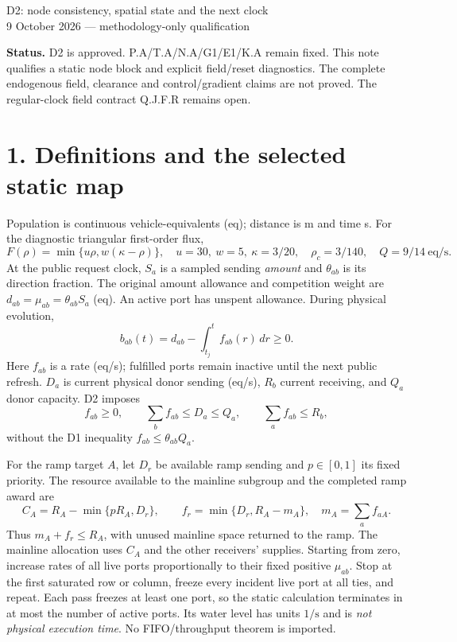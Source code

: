 \documentclass[11pt,a4paper]{article}
\begin{document}
\begin{center}{\Large D2: node consistency, spatial state and the next clock}\\[4pt]
9 October 2026 --- methodology-only qualification\end{center}
\textbf{Status.} D2 is approved. P.A/T.A/N.A/G1/E1/K.A remain fixed.
This note qualifies a static node block and explicit field/reset diagnostics.
The complete endogenous field, clearance and control/gradient claims are not
proved. The regular-clock field contract Q.J.F.R remains open.

\section*{1. Definitions and the selected static map}
Population is continuous vehicle-equivalents (eq); distance is m and time s.
For the diagnostic triangular first-order flux,
\[
 F(\rho)=\min\{u\rho,w(\kappa-\rho)\},\quad
 u=30,\ w=5,\ \kappa=3/20,\quad
 \rho_c=3/140,\quad Q=9/14\ \mathrm{eq/s}.
\]
At the public request clock, $S_a$ is a sampled sending \emph{amount} and
$\theta_{ab}$ is its direction fraction. The original amount allowance and
competition weight are $d_{ab}=\mu_{ab}=\theta_{ab}S_a$ (eq).
An active port has unspent allowance. During physical evolution,
\[
 b_{ab}(t)=d_{ab}-\int_{t_j}^{t}f_{ab}(r)\,dr\ge0.
\]
Here $f_{ab}$ is a rate (eq/s); fulfilled ports remain inactive until the
next public refresh. $D_a$ is current physical donor sending (eq/s),
$R_b$ current receiving, and $Q_a$ donor capacity. D2 imposes
\[
 f_{ab}\ge0,\qquad \sum_b f_{ab}\le D_a\le Q_a,\qquad
 \sum_a f_{ab}\le R_b,
\]
without the D1 inequality $f_{ab}\le\theta_{ab}Q_a$.

For the ramp target $A$, let $D_r$ be available ramp sending and
$p\in[0,1]$ its fixed priority. The resource available to the mainline
subgroup and the completed ramp award are
\[
 C_A=R_A-\min\{pR_A,D_r\},\qquad
 f_r=\min\{D_r,R_A-m_A\},\quad m_A=\sum_a f_{aA}.
\]
Thus $m_A+f_r\le R_A$, with unused mainline space returned to the ramp.
The mainline allocation uses $C_A$ and the other receivers' supplies.
Starting from zero, increase rates of all live ports proportionally to their
fixed positive $\mu_{ab}$. Stop at the first saturated row or column,
freeze every incident live port at all ties, and repeat. Each pass freezes
at least one port, so the static calculation terminates in at most the
number of active ports. Its water level has units $1/\mathrm{s}$ and is
\emph{not physical execution time}. No FIFO/throughput theorem is imported.
\end{document}
